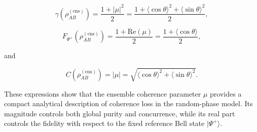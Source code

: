 \begin{equation}
\gamma\left(\rho_{AB}^{(\mathrm{ens})}\right)
=
\frac{1+|\mu|^2}{2}
=
\frac{1+\langle\cos\theta\rangle^2+\langle\sin\theta\rangle^2}{2},
\label{eq:d5_metric_summary_purity}
\end{equation}

\begin{equation}
F_{\Psi^+}\left(\rho_{AB}^{(\mathrm{ens})}\right)
=
\frac{1+\mathrm{Re}(\mu)}{2}
=
\frac{1+\langle\cos\theta\rangle}{2},
\label{eq:d5_metric_summary_fidelity}
\end{equation}

and

\begin{equation}
C\left(\rho_{AB}^{(\mathrm{ens})}\right)
=
|\mu|
=
\sqrt{\langle\cos\theta\rangle^2+\langle\sin\theta\rangle^2}.
\label{eq:d5_metric_summary_concurrence}
\end{equation}

These expressions show that the ensemble coherence parameter \( \mu \) provides a compact analytical description of coherence loss in the random-phase model. Its magnitude controls both global purity and concurrence, while its real part controls the fidelity with respect to the fixed reference Bell state \( |\Psi^+\rangle \).
